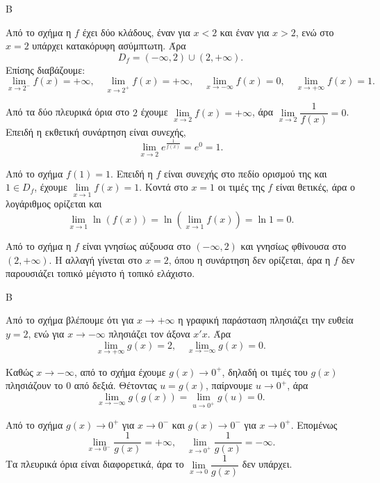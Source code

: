 \begin{thema}{Β}
\begin{erwthma}
\item Από το σχήμα η $f$ έχει δύο κλάδους, έναν για $x<2$ και έναν για $x>2$, ενώ στο $x=2$ υπάρχει κατακόρυφη ασύμπτωτη. Άρα
\[
D_f=(-\infty,2)\cup(2,+\infty).
\]
Επίσης διαβάζουμε:
\[
\lim_{x\to2^-}f(x)=+\infty,\quad
\lim_{x\to2^+}f(x)=+\infty,\quad
\lim_{x\to-\infty}f(x)=0,\quad
\lim_{x\to+\infty}f(x)=1.
\]

\item Από τα δύο πλευρικά όρια στο $2$ έχουμε $\lim\limits_{x\to2}f(x)=+\infty$, άρα $\lim\limits_{x\to2}\dfrac1{f(x)}=0$. Επειδή η εκθετική συνάρτηση είναι συνεχής,
\[
\lim_{x\to2}e^{\frac1{f(x)}}=e^0=1.
\]

\item Από το σχήμα $f(1)=1$. Επειδή η $f$ είναι συνεχής στο πεδίο ορισμού της και $1\in D_f$, έχουμε $\lim\limits_{x\to1}f(x)=1$. Κοντά στο $x=1$ οι τιμές της $f$ είναι θετικές, άρα ο λογάριθμος ορίζεται και
\[
\lim_{x\to1}\ln(f(x))=\ln\left(\lim_{x\to1}f(x)\right)=\ln1=0.
\]

\item Από το σχήμα η $f$ είναι γνησίως αύξουσα στο $(-\infty,2)$ και γνησίως φθίνουσα στο $(2,+\infty)$. Η αλλαγή γίνεται στο $x=2$, όπου η συνάρτηση δεν ορίζεται, άρα η $f$ δεν παρουσιάζει τοπικό μέγιστο ή τοπικό ελάχιστο.
\end{erwthma}
\end{thema}



\begin{thema}{Β}
\begin{erwthma}
\item Από το σχήμα βλέπουμε ότι για $x\to+\infty$ η γραφική παράσταση πλησιάζει την ευθεία $y=2$, ενώ για $x\to-\infty$ πλησιάζει τον άξονα $x'x$. Άρα
\[
\lim_{x\to+\infty}g(x)=2,\quad \lim_{x\to-\infty}g(x)=0.
\]

\item Καθώς $x\to-\infty$, από το σχήμα έχουμε $g(x)\to0^+$, δηλαδή οι τιμές του $g(x)$ πλησιάζουν το $0$ από δεξιά. Θέτοντας $u=g(x)$, παίρνουμε $u\to0^+$, άρα
\[
\lim_{x\to-\infty}g(g(x))=\lim_{u\to0^+}g(u)=0.
\]

\item Από το σχήμα $g(x)\to0^+$ για $x\to0^-$ και $g(x)\to0^-$ για $x\to0^+$. Επομένως
\[
\lim_{x\to0^-}\frac1{g(x)}=+\infty,\quad
\lim_{x\to0^+}\frac1{g(x)}=-\infty.
\]
Τα πλευρικά όρια είναι διαφορετικά, άρα το $\lim\limits_{x\to0}\dfrac1{g(x)}$ δεν υπάρχει.
\end{erwthma}
\end{thema}

